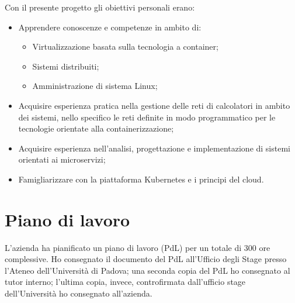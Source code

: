 Con il presente progetto gli obiettivi personali erano:

\begin{itemize}
	\item Apprendere conoscenze e competenze in ambito di:
		\begin{itemize}
			\item Virtualizzazione basata sulla tecnologia a 
                  container; 
			\item Sistemi distribuiti;
			\item Amministrazione di sistema Linux;
	    \end{itemize}
	\item Acquisire esperienza pratica nella gestione delle reti di 
          calcolatori in ambito dei sistemi, nello specifico le reti 
          definite in modo programmatico per le tecnologie orientate 
          alla containerizzazione; 
	\item Acquisire esperienza nell'analisi, progettazione e 
          implementazione di sistemi orientati ai microservizi;
	\item Famigliarizzare con la piattaforma Kubernetes e i principi 
		  del \gls{cloud}.
\end{itemize} 

\section{Piano di lavoro}
\label{sec:piano-di-lavoro}
L'azienda ha pianificato un piano di lavoro (PdL) per un totale di 300 ore 
complessive. 
Ho consegnato il documento del PdL all'Ufficio degli Stage presso l'Ateneo 
dell'Università di Padova; una seconda copia del PdL ho consegnato al tutor 
interno; l'ultima copia, invece, 
controfirmata dall'ufficio stage dell'Università ho consegnato all'azienda.


